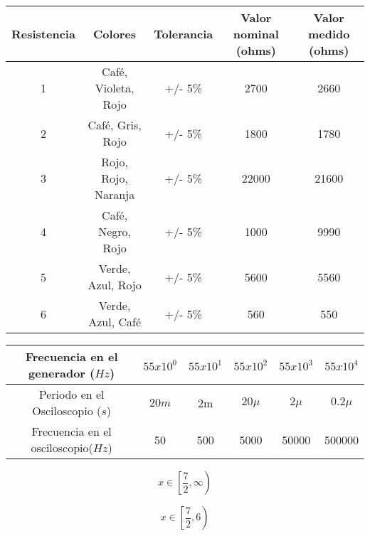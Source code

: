 \documentclass[11pt]{article}
\begin{document}
\begin{table*}
  \centering
  \begin{tabular}{@{}ccccc@{}}
    \toprule
Resistencia&	Colores&	Tolerancia&	Valor nominal (ohms)&	Valor medido (ohms)\\
\midrule
1&	Café, Violeta, Rojo&	+/- 5\% &	2700&	2660 \\
2&	Café, Gris, Rojo&	+/- 5\%&	1800  &	1780 \\
3&	Rojo, Rojo, Naranja&	+/- 5\%&	22000 &	21600 \\
4&	Café, Negro, Rojo&	+/- 5\%&	1000 &	9990  \\
5&	Verde, Azul, Rojo&	+/- 5\%&	5600 &	5560  \\
6&	Verde, Azul, Café&	+/- 5\%&	560 &	550\\
    \bottomrule
  \end{tabular}
  \caption{}
\end{table*}



\begin{table*}
  \centering
  \begin{tabular}{@{}cccccc@{}}
    \toprule
Frecuencia en el generador ($Hz$) & $55x10^0$ & $55x10^1$ & $55x10^2$ & $55x10^3$ & $55x10^4$\\ 
\midrule
Periodo en el Osciloscopio ($s$)&	 $20m$     &	 2m    &	  $20\mu$   &    $2\mu$        &    $0.2\mu$     \\
\midrule
Frecuencia en el osciloscopio($Hz$) &     50     &  500    &   5000   &     50000       &    500000     \\
    \bottomrule
  \end{tabular}
  \caption{}
\end{table*}

$$x \in \left[\frac{7}{2}, \infty\right)$$

$$x \in \left[\frac{7}{2}, 6\right)$$
\end{document}
